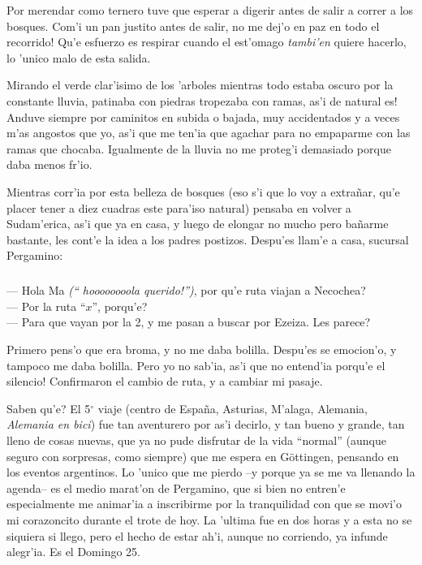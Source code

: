 Por merendar como ternero tuve que esperar a digerir antes de salir a correr a
los bosques. Com'i un pan justito antes de salir, \textexclamdown no me dej'o en
paz en todo el recorrido! Qu'e esfuerzo es respirar cuando el est'omago {\sl
tambi'en} quiere hacerlo, lo 'unico malo de esta salida.

Mirando el verde clar'isimo de los 'arboles mientras todo estaba oscuro por la
constante lluvia, patinaba con piedras tropezaba con ramas, \textexclamdown as'i
de natural es! Anduve siempre por caminitos en subida o bajada, muy accidentados
y a veces m'as angostos que yo, as'i que me ten'ia que agachar para no empaparme
con las ramas que chocaba. Igualmente de la lluvia no me proteg'i demasiado
porque daba menos fr'io.

Mientras corr'ia por esta belleza de bosques (eso s'i que lo voy a extra\~nar,
qu'e placer tener a diez cuadras este para'iso natural) pensaba en volver a
Sudam'erica, as'i que ya en casa, y luego de elongar no mucho pero ba\~narme
bastante, les cont'e la idea a los padres postizos. Despu'es llam'e a casa,
sucursal Pergamino:

\subparagraph{}\label{ssub:holaVieja} --- Hola Ma {\sl (``\textexclamdown
hoooooooola querido!'')}, \textquestiondown por qu'e ruta viajan a Necochea?\\
--- Por la ruta ``$x$'', \textquestiondown porqu'e?\\ --- Para que vayan por la
2, y me pasan a buscar por Ezeiza. \textquestiondown Les parece?\\
\hangindent=1cm

Primero pens'o que era broma, y no me daba bolilla. Despu'es se emocion'o, y
tampoco me daba bolilla. \textexclamdown Pero yo no sab'ia, as'i que no
entend'ia porqu'e el silencio! Confirmaron el cambio de ruta, y a cambiar mi
pasaje.

\textquestiondown Saben qu'e? El 5$^\circ$ viaje (centro de Espa\~na, Asturias,
M'alaga, Alemania, {\sl Alemania en bici}) fue tan aventurero por as'i decirlo,
y tan bueno y grande, tan lleno de cosas nuevas, que ya no pude
disfrutar de la vida ``normal'' (aunque seguro con sorpresas, como siempre) que
me espera en G\"ottingen, pensando en los eventos argentinos. Lo 'unico que me
pierdo --y porque ya se me va llenando la agenda-- es el medio marat'on de
Pergamino, que si bien no entren'e especialmente me animar'ia a inscribirme por
la tranquilidad con que se movi'o mi corazoncito durante el trote de hoy. La
'ultima fue en dos horas y a esta no se siquiera si llego, pero el hecho
de estar ah'i, aunque no corriendo, ya infunde alegr'ia. Es el Domingo 25.

